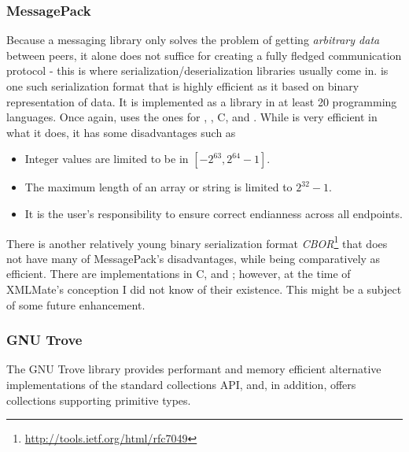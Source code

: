 \subsubsection{MessagePack}
Because a messaging library only solves the problem of getting \emph{arbitrary data} between peers, it 
alone does not suffice for creating a fully fledged communication protocol - this is where serialization/deserialization libraries 
usually come in. \msgpack\cite{msgpack} is one such serialization format that is highly efficient as it based on 
binary representation of data. It is implemented as a library in at least 20 programming languages. 
Once again, \xmlmate uses the ones for \java, \python, {\small C}, and \cpp.
While \msgpack is very efficient in what it does, it has some disadvantages such as 
\begin{itemize}
  \item Integer values are limited to be in $[-2^{63}, 2^{64}-1]$.
  \item The maximum length of an array or string is limited to $2^{32}-1$.
  \item It is the user's responsibility to ensure correct endianness across all endpoints.
\end{itemize}

There is another relatively young binary serialization format \emph{CBOR}\footnote{\url{http://tools.ietf.org/html/rfc7049}} 
that does not have many of {\small MessagePack's} disadvantages, while being comparatively as efficient.
There are implementations in {\small C}, \python and \java; however, at the time of {\small XMLMate's}
conception I did not know of their existence. This might be a subject of some future enhancement.
\subsubsection{GNU Trove}
\label{sec:trove}
The GNU Trove \java library provides performant and memory efficient alternative implementations of the
standard \java collections API, and, in addition, offers collections supporting primitive types. 

